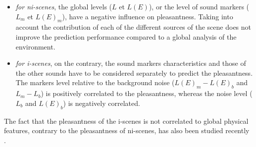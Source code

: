 \documentclass[12pt]{elsarticle}
\newcommand{\cf}{cf.}
\begin{document}
\begin{itemize}
\begin{itemize}
\item \emph{for ni-scenes}, the global levels ($L$ et $L(E)$), or the level of sound markers ($L_m$ et $L(E)_{m}$), have a negative influence on pleasantness. Taking into account the contribution of each of the different sources of the scene does not improve the prediction performance compared to a global analysis of the environment.


\item \emph{for i-scenes}, on the contrary, the sound markers characteristics and those of the other sounds have to be considered separately to predict  the pleasantness. The markers level relative to the background noise ($L(E)_m-L(E)_b$ and $L_m-L_b$) is positively correlated to the pleasantness, whereas the noise level ($L_b$ and $L(E)_b$) is negatively correlated.

\end{itemize}
\end{itemize}


The fact that the pleasantness of the i-scenes is not correlated to global physical features, contrary to the pleasantness of ni-scenes, has also been studied recently \cite{gozalo2015relationship}.

\end{document}
